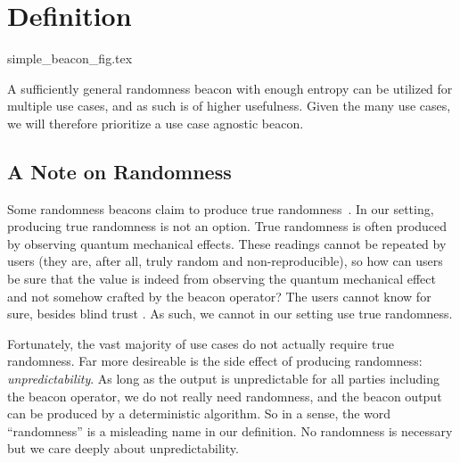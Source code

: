 \section{Definition}



{simple_beacon_fig.tex}

A sufficiently general randomness beacon with enough entropy can be utilized for multiple use cases, and as such is of higher usefulness. Given the many use cases, we will therefore prioritize a use case agnostic beacon.

\subsection{A Note on Randomness}
Some randomness beacons claim to produce true randomness~\cite{nistbeacon}. In our setting, producing true randomness is not an option. True randomness is often produced by observing quantum mechanical effects. These readings cannot be repeated by users (they are, after all, truly random and non-reproducible), so how can users be sure that the value is indeed from observing the quantum mechanical effect and not somehow crafted by the beacon operator? The users cannot know for sure, besides blind trust . As such, we cannot in our setting use true randomness.

Fortunately, the vast majority of use cases do not actually require true randomness. Far more desireable is the side effect of producing randomness: \emph{unpredictability}. As long as the output is unpredictable for all parties including the beacon operator, we do not really need randomness, and the beacon output can be produced by a deterministic algorithm. So in a sense, the word \enquote{randomness} is a misleading name in our definition. No randomness is necessary but we care deeply about unpredictability.

